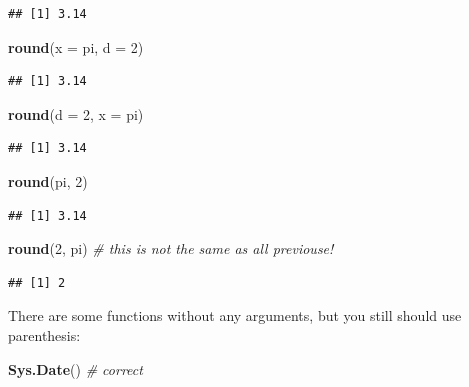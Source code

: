 \documentclass[
]{book}
\newenvironment{Shaded}{\begin{snugshade}}{\end{snugshade}}
\newcommand{\CommentTok}[1]{\textcolor[rgb]{0.56,0.35,0.01}{\textit{#1}}}
\newcommand{\DataTypeTok}[1]{\textcolor[rgb]{0.13,0.29,0.53}{#1}}
\newcommand{\DecValTok}[1]{\textcolor[rgb]{0.00,0.00,0.81}{#1}}
\newcommand{\KeywordTok}[1]{\textcolor[rgb]{0.13,0.29,0.53}{\textbf{#1}}}
\newcommand{\NormalTok}[1]{#1}
\begin{document}
\begin{verbatim}
## [1] 3.14
\end{verbatim}

\begin{Shaded}
\begin{Highlighting}[]
\KeywordTok{round}\NormalTok{(}\DataTypeTok{x =}\NormalTok{ pi, }\DataTypeTok{d =} \DecValTok{2}\NormalTok{)}
\end{Highlighting}
\end{Shaded}

\begin{verbatim}
## [1] 3.14
\end{verbatim}

\begin{Shaded}
\begin{Highlighting}[]
\KeywordTok{round}\NormalTok{(}\DataTypeTok{d =} \DecValTok{2}\NormalTok{, }\DataTypeTok{x =}\NormalTok{ pi)}
\end{Highlighting}
\end{Shaded}

\begin{verbatim}
## [1] 3.14
\end{verbatim}

\begin{Shaded}
\begin{Highlighting}[]
\KeywordTok{round}\NormalTok{(pi, }\DecValTok{2}\NormalTok{)}
\end{Highlighting}
\end{Shaded}

\begin{verbatim}
## [1] 3.14
\end{verbatim}

\begin{Shaded}
\begin{Highlighting}[]
\KeywordTok{round}\NormalTok{(}\DecValTok{2}\NormalTok{, pi) }\CommentTok{# this is not the same as all previouse!}
\end{Highlighting}
\end{Shaded}

\begin{verbatim}
## [1] 2
\end{verbatim}

There are some functions without any arguments, but you still should use parenthesis:

\begin{Shaded}
\begin{Highlighting}[]
\KeywordTok{Sys.Date}\NormalTok{() }\CommentTok{# correct}
\end{Highlighting}
\end{Shaded}
\end{document}
